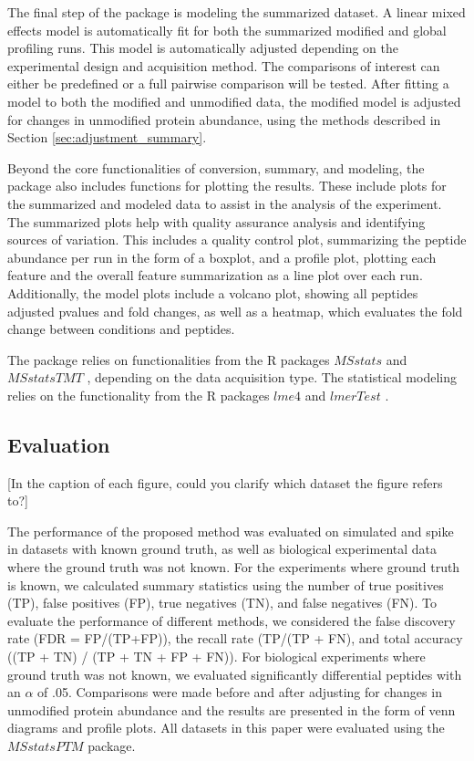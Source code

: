 \documentclass[mcp]{article}
\numberwithin{figure}{section} %
\numberwithin{table}{section}
\def\todo#1{{\color{red}[#1]}}
\begin{document}
The final step of the package is modeling the summarized dataset. A linear mixed effects model is automatically fit for both the summarized modified and global profiling runs. This model is automatically adjusted depending on the experimental design and acquisition method. The comparisons of interest can either be predefined or a full pairwise comparison will be tested. After fitting a model to both the modified and unmodified data, the modified model is adjusted for changes in unmodified protein abundance, using the methods described in Section \ref{sec:adjustment_summary}. 

Beyond the core functionalities of conversion, summary, and modeling, the package also includes functions for plotting the results. These include plots for the summarized and modeled data to assist in the analysis of the experiment. The summarized plots help with quality assurance analysis and identifying sources of variation. This includes a quality control plot, summarizing the peptide abundance per run in the form of a boxplot, and a profile plot, plotting each feature and the overall feature summarization as a line plot over each run. Additionally, the model plots include a volcano plot, showing all peptides adjusted pvalues and fold changes, as well as a heatmap, which evaluates the fold change between conditions and peptides. 

The package relies on functionalities from the R packages $MSstats$ \cite{Choi:2014} and $MSstatsTMT$ \cite{Huang:2020}, depending on the data acquisition type. The statistical modeling relies on the functionality from the R packages $lme4$ \cite{Bates2015} and $lmerTest$ \cite{Kuznetsova2017}. 

\subsection*{Evaluation}

\todo{In the caption of each figure, could you clarify which dataset the figure refers to?}

The performance of the proposed method was evaluated on simulated and spike in datasets with known ground truth, as well as biological experimental data where the ground truth was not known. For the experiments where ground truth is known, we calculated summary statistics using the number of true positives (TP), false positives (FP), true negatives (TN), and false negatives (FN). To evaluate the performance of different methods, we considered the false discovery rate (FDR = FP/(TP+FP)), the recall rate (TP/(TP + FN), and total accuracy ((TP + TN) / (TP + TN + FP + FN)). For biological experiments where ground truth was not known, we evaluated significantly differential peptides with an $\alpha$ of .05. Comparisons were made before and after adjusting for changes in unmodified protein abundance and the results are presented in the form of venn diagrams and profile plots. All datasets in this paper were evaluated using the $MSstatsPTM$ package.
\end{document}
